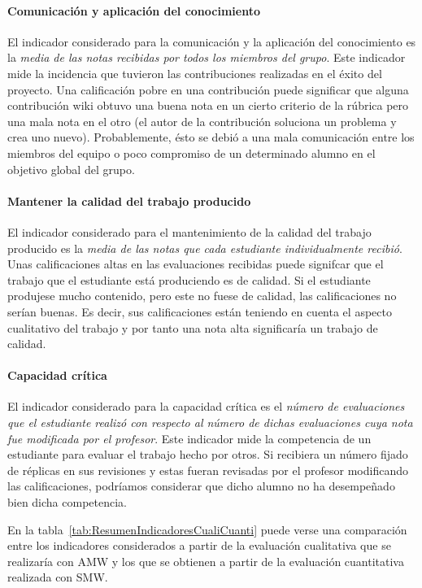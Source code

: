 \paragraph*{Comunicación y aplicación del conocimiento}
El indicador considerado para la comunicación y la aplicación del conocimiento es la \emph{media de las notas recibidas por todos los miembros del grupo}. Este indicador mide la incidencia que tuvieron las contribuciones realizadas en el éxito del proyecto. Una calificación pobre en una contribución puede significar  que alguna contribución wiki obtuvo una buena nota en un cierto criterio de la rúbrica pero una mala nota en el otro (el autor de la contribución soluciona un problema y crea uno nuevo). Probablemente, ésto se debió a una mala comunicación entre los miembros del equipo o poco compromiso de un determinado alumno en el objetivo global del grupo. 

\paragraph*{Mantener la calidad del trabajo producido}
El indicador considerado para el mantenimiento de la calidad del trabajo producido es la \emph{media de las notas que cada estudiante individualmente recibió}. Unas calificaciones altas en las evaluaciones recibidas puede signifcar que el trabajo que el estudiante está produciendo es de calidad. Si el estudiante produjese mucho contenido, pero este no fuese de calidad, las calificaciones no serían buenas. Es decir, sus calificaciones están teniendo en cuenta el aspecto cualitativo del trabajo y por tanto una nota alta significaría un trabajo de calidad.

\paragraph*{Capacidad crítica}
El indicador considerado para la capacidad crítica es el \emph{número de evaluaciones que el estudiante realizó con respecto al número de dichas evaluaciones cuya nota fue modificada por el profesor}. Este indicador mide la competencia de un estudiante para evaluar el trabajo hecho por otros. Si recibiera un número fijado de réplicas en sus revisiones y estas fueran revisadas por el profesor modificando las calificaciones, podríamos considerar que dicho alumno no ha desempeñado bien dicha competencia.

En la tabla~\ref{tab:ResumenIndicadoresCualiCuanti} puede verse una comparación entre los indicadores considerados a partir de la evaluación cualitativa que se realizaría con AMW y los que se obtienen a partir de la evaluación cuantitativa realizada con SMW.

